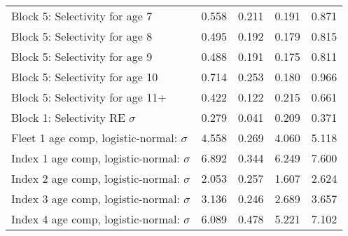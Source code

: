 \documentclass[
]{article}
\begin{document}
\begin{landscape}
\begin{longtable}[t]{lrrrr}
\addlinespace
Block 5: Selectivity for age 7 & 0.558 & 0.211 & 0.191 & 0.871\\
Block 5: Selectivity for age 8 & 0.495 & 0.192 & 0.179 & 0.815\\
Block 5: Selectivity for age 9 & 0.488 & 0.191 & 0.175 & 0.811\\
Block 5: Selectivity for age 10 & 0.714 & 0.253 & 0.180 & 0.966\\
Block 5: Selectivity for age 11+ & 0.422 & 0.122 & 0.215 & 0.661\\
\addlinespace
Block 1: Selectivity RE $\sigma$ & 0.279 & 0.041 & 0.209 & 0.371\\
Fleet 1 age comp, logistic-normal: $\sigma$ & 4.558 & 0.269 & 4.060 & 5.118\\
Index 1 age comp, logistic-normal: $\sigma$ & 6.892 & 0.344 & 6.249 & 7.600\\
Index 2 age comp, logistic-normal: $\sigma$ & 2.053 & 0.257 & 1.607 & 2.624\\
Index 3 age comp, logistic-normal: $\sigma$ & 3.136 & 0.246 & 2.689 & 3.657\\
\addlinespace
Index 4 age comp, logistic-normal: $\sigma$ & 6.089 & 0.478 & 5.221 & 7.102\\*
\end{longtable}
\end{landscape}
\end{document}
